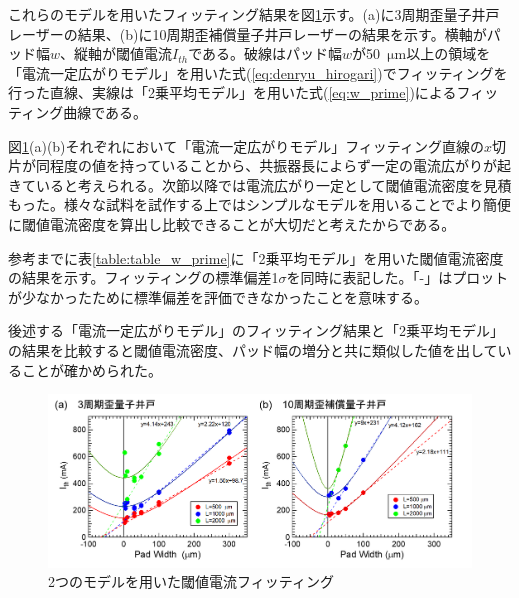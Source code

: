 これらのモデルを用いたフィッティング結果を図\ref{fig:fig_3_1_w_prime}示す。(a)に3周期歪量子井戸レーザーの結果、(b)に10周期歪補償量子井戸レーザーの結果を示す。横軸がパッド幅$w$、縦軸が閾値電流$I_{th}$である。破線はパッド幅$w$が50\ $\si{\micro\metre}$以上の領域を「電流一定広がりモデル」を用いた式(\ref{eq:denryu_hirogari})でフィッティングを行った直線、実線は「2乗平均モデル」を用いた式(\ref{eq:w_prime})によるフィッティング曲線である。

図\ref{fig:fig_3_1_w_prime}(a)(b)それぞれにおいて「電流一定広がりモデル」フィッティング直線の$x$切片が同程度の値を持っていることから、共振器長によらず一定の電流広がりが起きていると考えられる。次節以降では電流広がり一定として閾値電流密度を見積もった。様々な試料を試作する上ではシンプルなモデルを用いることでより簡便に閾値電流密度を算出し比較できることが大切だと考えたからである。


参考までに表\ref{table:table_w_prime}に「2乗平均モデル」を用いた閾値電流密度の結果を示す。フィッティングの標準偏差1$\sigma$を同時に表記した。「-」はプロットが少なかったために標準偏差を評価できなかったことを意味する。

後述する「電流一定広がりモデル」のフィッティング結果と「2乗平均モデル」の結果を比較すると閾値電流密度、パッド幅の増分と共に類似した値を出していることが確かめられた。





\begin{figure}[h]
	\centering
	\includegraphics[width=15cm]{figure/fig_3_1_w_prime.png}
	\caption{2つのモデルを用いた閾値電流フィッティング}
	\label{fig:fig_3_1_w_prime}
\end{figure}

